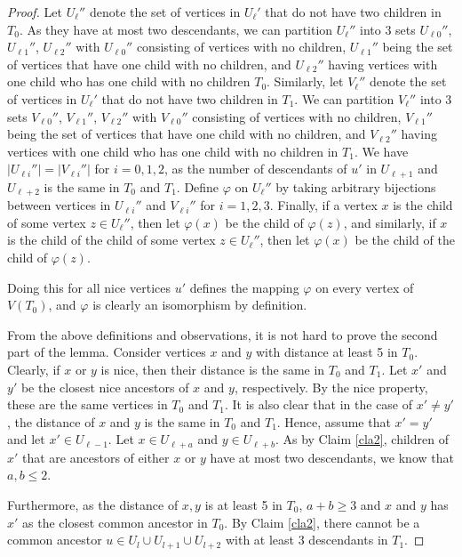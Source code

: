 \documentclass[12pt,a4paper]{amsart}
\theoremstyle{plain}
\theoremstyle{definition}
\begin{document}
\begin{proof}
Let $U_\ell''$ denote the set of vertices in $U_\ell'$ that do not have two children in $T_0$. As they have at most two descendants, we can partition $U_\ell''$ into $3$ sets $U_{\ell 0}''$, $U_{\ell 1}''$, $U_{\ell 2}''$ with $U_{\ell 0}''$ consisting of vertices with no children, $U_{\ell 1}''$ being the set of vertices that have one child with no children, and $U_{\ell 2}''$ having vertices with one child who has one child with no children $T_0$. Similarly, let $V_\ell''$ denote the set of vertices in $U_\ell'$ that do not have two children in $T_1$. We can partition $V_\ell''$ into $3$ sets $V_{\ell 0}''$, $V_{\ell 1}''$, $V_{\ell 2}''$ with $V_{\ell 0}''$ consisting of vertices with no children, $V_{\ell 1}''$ being the set of vertices that have one child with no children, and $V_{\ell 2}''$ having vertices with one child who has one child with no children in $T_1$. 
We have $|U_{\ell i}''|=|V_{\ell i}''|$ for $i=0,1,2$, as the number of descendants of $u'$ in $U_{\ell+1}$ and $U_{\ell+2}$ is the same in $T_0$ and $T_1$.
Define $\varphi$ on $U_\ell''$ by taking arbitrary bijections between vertices in $U_{\ell i}''$ and $V_{\ell i}''$ for $i=1,2,3$. Finally, if a vertex $x$ is the child of some vertex $z \in U_\ell''$, then let $\varphi(x)$ be the child of $\varphi(z)$, and similarly, if $x$ is the child of the child of some vertex $z \in U_\ell''$, then let $\varphi(x)$ be the child of the child of $\varphi(z)$.

Doing this for all nice vertices $u'$ defines the mapping $\varphi$ on every vertex of $V(T_0)$, and $\varphi$ is clearly an isomorphism by definition.

From the above definitions and observations, it is not hard to prove the second part of the lemma. Consider vertices $x$ and $y$ with distance at least 5 in $T_0$. Clearly, if $x$ or $y$ is nice, then their distance is the same in $T_0$ and $T_1$. Let $x'$ and $y'$ be the closest nice ancestors of $x$ and $y$, respectively. By the nice property, these are the same vertices in $T_0$ and $T_1$. It is also clear that in the case of $x' \neq y'$, the distance of $x$ and $y$ is the same in $T_0$ and $T_1$. Hence, assume that $x'=y'$ and let $x' \in U_{\ell-1}$. Let $x \in U_{\ell+a}$ and $y \in U_{\ell+b}$. As by Claim \ref{cla2}, children of $x'$ that are ancestors of either $x$ or $y$ have at most two descendants, we know that $a,b \leq 2$. 

Furthermore, as the distance of $x,y$  is at least 5 in $T_0$, $a+b \geq 3$ and $x$ and $y$ has $x'$ as the closest common ancestor in $T_0$. By Claim \ref{cla2}, there cannot be a common ancestor $u \in U_{l} \cup U_{l+1} \cup U_{l+2}$ with at least 3 descendants in $T_1$.


\end{proof}
\end{document}
